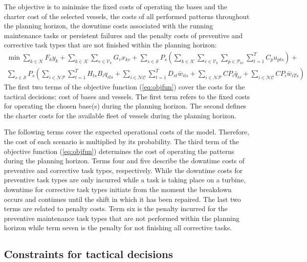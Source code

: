 The objective is to minimise the fixed costs of operating the bases and the charter cost of the selected vessels, the costs of all performed patterns throughout the planning horizon, the downtime costs associated with the running maintenance tasks or persistent failures and the penalty costs of preventive and corrective task types that are not finished within the planning horizon:
%
\begin{align}
\label{eq:objfun}
 \min  	\sum\limits_{k\in \mathcal{K}} F_k y_k  %
	      + \sum\limits_{k\in \mathcal{K}}\sum\limits_{v\in\mathcal{V}_k} G_v x_{kv} %
	      + \sum\limits_{s\in\mathcal{S}} P_{s} \left(\sum\limits_{k\in\mathcal{K}} \sum\limits_{v\in\mathcal{V}_k} \sum\limits_{p\in\mathcal{P}_{kv}} \sum\limits_{t=1}^T C_{p}u_{pts}\right) +\\ \nonumber
	     \sum\limits_{s\in\mathcal{S}} P_{s} \left(\sum\limits_{i\in \mathcal{NP}}  \sum\limits_{t=1}^TH_{ts}B_{i}q_{its}
+ \sum\limits_{i \in\mathcal{NC}} \sum\limits_{t=1}^T D_{st} \bar{w}_{its} +  \sum\limits_{i \in\mathcal{NP}} CP_i \bar{q}_{is} + \sum\limits_{i \in\mathcal{NC}} CP_i \bar{w}_{iTs}\right)
\end{align}
%
The first two terms of the objective function (\ref{eq:objfun}) cover the costs for the tactical decisions: cost of bases and vessels. The first term refers to the fixed costs for operating the chosen base(s) during the  planning horizon. The second defines the charter costs for the available fleet of vessels during the  planning horizon.

The following terms cover the expected operational costs of the model. Therefore, the cost of each scenario is  multiplied by its probability. The third term of the objective function (\ref{eq:objfun}) determines the cost of operating the patterns during the planning horizon. Terms four and five describe the downtime costs of preventive and corrective task types, respectively. While the downtime costs for preventive task types are only incurred while a task is taking place on a turbine, downtime for corrective task types initiate from the moment the breakdown occurs and continues until the shift in which it has been repaired. The last two terms are related to penalty costs. Term six is the penalty incurred for the preventive maintenance task types that are not performed within the planning horizon while term seven is the penalty for not finishing all corrective tasks.



\subsection{Constraints for tactical decisions}

